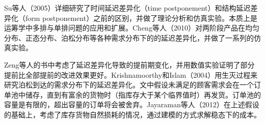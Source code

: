 Su等人（2005）\cite{su_evaluation_2005}详细研究了时间延迟差异化（time postponement）和结构延迟差异化（form postponement）之前的区别，并做了理论分析和仿真实验。本质上是运筹学中多排与单排问题的应用和扩展。Cheng等人（2010）\cite{cheng_simulation_2010}对两阶段产品在均匀分布、正态分布、泊松分布等各种需求分布下的的延迟差异化，并做了一系列的仿真实验。

Zeng等人\cite{zeng_research_????}的书中考虑了延迟差异化导致的提前期变化，并用数值实验证明了部分提前比全部提前的改进效果更好。Krishnamoorthy和Islam（2004）\cite{krishnamoorthy_s_2004}用生灭过程来研究泊松到达的需求分布下的延迟差异化。文中假设未满足的顾客需求会在一个订单池中储存，直到有富余的货物时（指库存大于某个临界值时）再发货。订单池的容量是有限的，超出容量的订单将会被舍弃。Jayaraman等人（2012）\cite{jayaraman_perishable_2012}在上述假设的基础上，考虑了库存货物自然损耗的情况，通过建模的方式求解稳态下的成本。






















